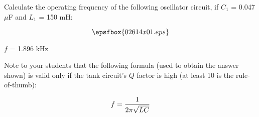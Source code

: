

Calculate the operating frequency of the following oscillator circuit, if $C_1$ = 0.047 $\mu$F and $L_1$ = 150 mH:

$$\epsfbox{02614x01.eps}$$







$f$ = 1.896 kHz







Note to your students that the following formula (used to obtain the answer shown) is valid only if the tank circuit's $Q$ factor is high (at least 10 is the rule-of-thumb):

$$f = {1 \over {2 \pi \sqrt{LC}}}$$





